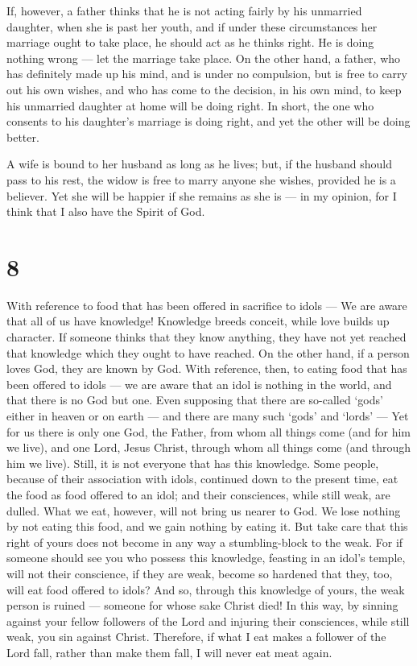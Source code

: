  If, however, a father thinks that he is not acting fairly
by his unmarried daughter, when she is past her youth, and if under
these circumstances her marriage ought to take place, he should act as
he thinks right. He is doing nothing wrong --- let the marriage take
place.  On the other hand, a father, who has definitely
made up his mind, and is under no compulsion, but is free to carry out
his own wishes, and who has come to the decision, in his own mind, to
keep his unmarried daughter at home will be doing right. 
In short, the one who consents to his daughter's marriage is doing
right, and yet the other will be doing better.

 A wife is bound to her husband as long as he lives; but,
if the husband should pass to his rest, the widow is free to marry
anyone she wishes, provided he is a believer.  Yet she will
be happier if she remains as she is --- in my opinion, for I think that
I also have the Spirit of God.

\hypertarget{section-7}{%
\section{8}\label{section-7}}

 With reference to food that has been offered in sacrifice
to idols --- We are aware that all of us have knowledge! Knowledge
breeds conceit, while love builds up character.  If someone
thinks that they know anything, they have not yet reached that knowledge
which they ought to have reached.  On the other hand, if a
person loves God, they are known by God.  With reference,
then, to eating food that has been offered to idols --- we are aware
that an idol is nothing in the world, and that there is no God but one.
 Even supposing that there are so-called `gods' either in
heaven or on earth --- and there are many such `gods' and `lords' ---
 Yet for us there is only one God, the Father, from whom all
things come (and for him we live), and one Lord, Jesus Christ, through
whom all things come (and through him we live).  Still, it
is not everyone that has this knowledge. Some people, because of their
association with idols, continued down to the present time, eat the food
as food offered to an idol; and their consciences, while still weak, are
dulled.  What we eat, however, will not bring us nearer to
God. We lose nothing by not eating this food, and we gain nothing by
eating it.  But take care that this right of yours does not
become in any way a stumbling-block to the weak.  For if
someone should see you who possess this knowledge, feasting in an idol's
temple, will not their conscience, if they are weak, become so hardened
that they, too, will eat food offered to idols?  And so,
through this knowledge of yours, the weak person is ruined --- someone
for whose sake Christ died!  In this way, by sinning
against your fellow followers of the Lord and injuring their
consciences, while still weak, you sin against Christ. 
Therefore, if what I eat makes a follower of the Lord fall, rather than
make them fall, I will never eat meat again.

